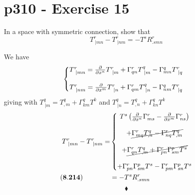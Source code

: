 \section{p310 - Exercise 15}
\begin{tcolorbox}
In a space with symmetric connection, show that 
$$T^r_{\ |mn} - T^r_{\ |nm } = - T^s R^r_{.smn}$$
\end{tcolorbox}
We have 
\begin{align*}
&\left\{\begin{matrix}
T^r_{\ |mn} = \pdv{}{x^n}T^r_{\ |m} + \Gamma^r_{qn}T^q_{\ |m} -\Gamma^q_{mn}T^r_{\ |q}\\\\
T^r_{\ |nm} = \pdv{}{x^m}T^r_{\ |n} + \Gamma^r_{qm}T^q_{\ |n} -\Gamma^q_{nm}T^r_{\ |q} 
\end{matrix}\right.
\end{align*}
giving with $ T^q_{\ |m}= T^q_{,m}+ \Gamma^q_{km}T^k$ and  $ T^q_{\ |n}= T^q_{,n}+ \Gamma^q_{kn}T^k$
\begin{align*}
T^r_{\ |mn}-T^r_{\ |nm}= &\left\{\begin{matrix}
T^s\left(\pdv{}{x^n}\Gamma^r_{ms}-\pdv{}{x^m}\Gamma^r_{ns}\right)\\\\
+ \cancel{\Gamma^r_{mq}T^q_{,n}-\Gamma^r_{nq}T^q_{,m}}
\\\\
  +\cancel{\Gamma^r_{qn}T^q_{,m}+\Gamma^r_{pn} \Gamma^p_{sm}T^s}\\\\
 +\Gamma^r_{pn}\Gamma^p_{sm}T^s- \Gamma^r_{pm}\Gamma^p_{sn}T^s
\end{matrix}\right.\\
\mathbf{(8.214)}\quad\quad\quad\quad &= -T^sR^r_{.smn}
\end{align*}
$$\blacklozenge$$
\newpage

